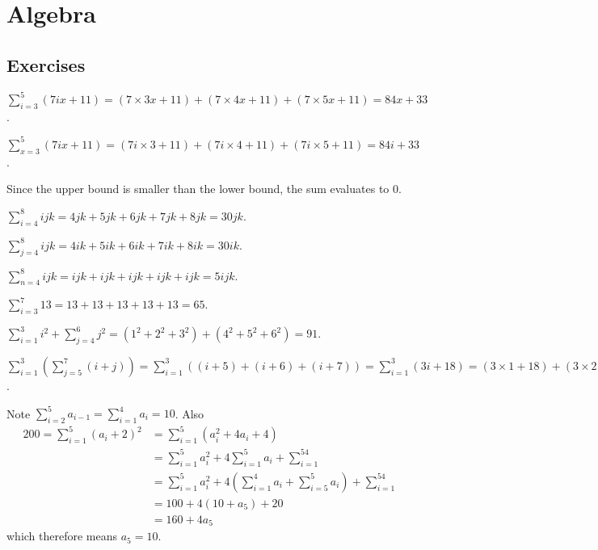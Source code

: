 \section{Algebra}
\subsection*{Exercises}
\begin{questions}
    \item \begin{partquestions}{\alph*}
        \item $\displaystyle \sum_{i=3}^{5}(7ix+11) = (7\times3x + 11) + (7\times4x + 11) + (7\times5x + 11) = 84x + 33$.
        \item $\displaystyle \sum_{x=3}^{5}(7ix+11) = (7i\times3 + 11) + (7i\times4 + 11) + (7i\times5 + 11) = 84i + 33$.
        \item Since the upper bound is smaller than the lower bound, the sum evaluates to 0.
        \item $\displaystyle \sum_{i=4}^{8}ijk = 4jk + 5jk + 6jk + 7jk + 8jk = 30jk$.
        \item $\displaystyle \sum_{j=4}^{8}ijk = 4ik + 5ik + 6ik + 7ik + 8ik = 30ik$.
        \item $\displaystyle \sum_{n=4}^{8}ijk = ijk + ijk + ijk + ijk + ijk = 5ijk$.
        \item $\displaystyle \sum_{i=3}^{7}13 = 13 + 13 + 13 + 13 + 13 = 65$.
        \item $\displaystyle \sum_{i=1}^{3}i^2 + \sum_{j=4}^{6}j^2 = (1^2 + 2^2 + 3^2) + (4^2 + 5^2 + 6^2) = 91$.
        \item $\displaystyle \sum_{i=1}^{3}\left(\sum_{j=5}^{7}(i+j)\right) = \sum_{i=1}^{3}\left((i+5) + (i+6) + (i+7)\right) = \sum_{i=1}^{3}\left(3i+18\right) = (3\times1 + 18) + (3\times2 + 18) + (3\times3 + 18) = 72$.
    \end{partquestions}

    \item Note $\displaystyle \sum_{i=2}^5a_{i-1} = \sum_{i=1}^4a_i = 10$. Also
    \begin{align*}
        200 = \sum_{i=1}^5(a_i+2)^2 &= \sum_{i=1}^5(a_i^2 + 4a_i + 4)\\
        &= \sum_{i=1}^5a_i^2 + 4\sum_{i=1}^5a_i + \sum_{i=1}^54\\
        &= \sum_{i=1}^5a_i^2 + 4\left(\sum_{i=1}^4a_i + \sum_{i=5}^5a_i\right) + \sum_{i=1}^54\\
        &= 100 + 4\left(10 + a_5\right) + 20\\
        &= 160 + 4a_5
    \end{align*}
    which therefore means $a_5 = 10$.


\end{questions}
